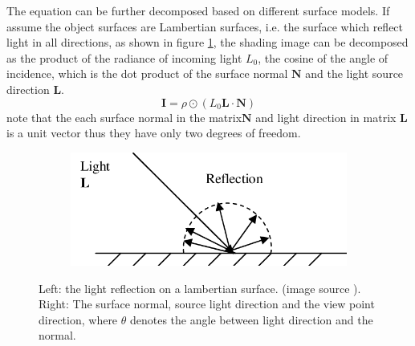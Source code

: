 The equation can be further decomposed based on different surface models. If assume the object surfaces are Lambertian surfaces, i.e. the surface which reflect light in all directions, as shown in figure \ref{fig:lambertian-surface}, the shading image can be decomposed as the product of the  radiance of  incoming light $ L_0 $, the cosine of the angle of incidence, which is the dot product of the surface normal $ \textbf{N} $ and the light source direction $ \textbf{L} $.
\[ \textbf{I} = \rho  \odot ( L_0 \textbf{L} \cdot  \textbf{N}) \]
note that the each surface normal in the matrix$ \textbf{N} $ and light direction in matrix $ \textbf{L} $ is a unit vector thus they have only two degrees of freedom. 

\begin{figure}[th]
	\centering
	\begin{subfigure}[b]{0.48\linewidth}
		\includegraphics[width=\textwidth]{./Figures/Lambertian-Reflection-Lambertian-Surface.png}
	\end{subfigure}
	\begin{subfigure}[b]{0.48\linewidth}
	\end{subfigure}
	\decoRule
	\caption{Left: the light reflection on a lambertian surface. (image source \cite{lambertian-reflectance}). Right: The surface normal, source light direction and the view point direction, where $ \theta $ denotes the angle between light direction and the normal.}
	\label{fig:lambertian-surface}
\end{figure}

